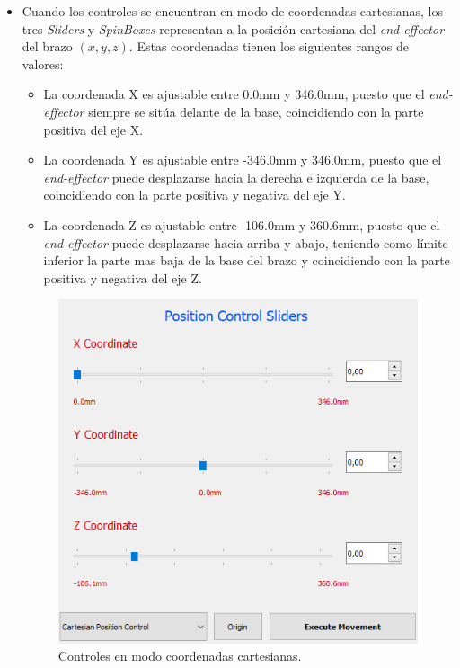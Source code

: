 \begin{itemize}
        \item Cuando los controles se encuentran en modo de coordenadas cartesianas, los tres \textit{Sliders} y \textit{SpinBoxes} representan a la posición cartesiana del \textit{end-effector} del brazo $(x, y, z)$. Estas coordenadas tienen los siguientes rangos de valores:
        \begin{itemize}
            \item La coordenada X es ajustable entre 0.0mm y 346.0mm, puesto que el \textit{end-effector} siempre se sitúa delante de la base, coincidiendo con la parte positiva del eje X. 
            \item La coordenada Y es ajustable entre -346.0mm y 346.0mm, puesto que el \textit{end-effector} puede desplazarse hacia la derecha e izquierda de la base, coincidiendo con la parte positiva y negativa del eje Y.
            \item La coordenada Z es ajustable entre -106.0mm y 360.6mm, puesto que el \textit{end-effector} puede desplazarse hacia arriba y abajo, teniendo como límite inferior la parte mas baja de la base del brazo y coincidiendo con la parte positiva y negativa del eje Z.
        \end{itemize}
        \begin{figure}[H]
            \centering
            \includegraphics[width=0.55\linewidth]{pictures/Cartesian_Gui.PNG}
            \caption{Controles en modo coordenadas cartesianas.}
            \label{fig:ui_cartesian}
        \end{figure}
    \end{itemize}

